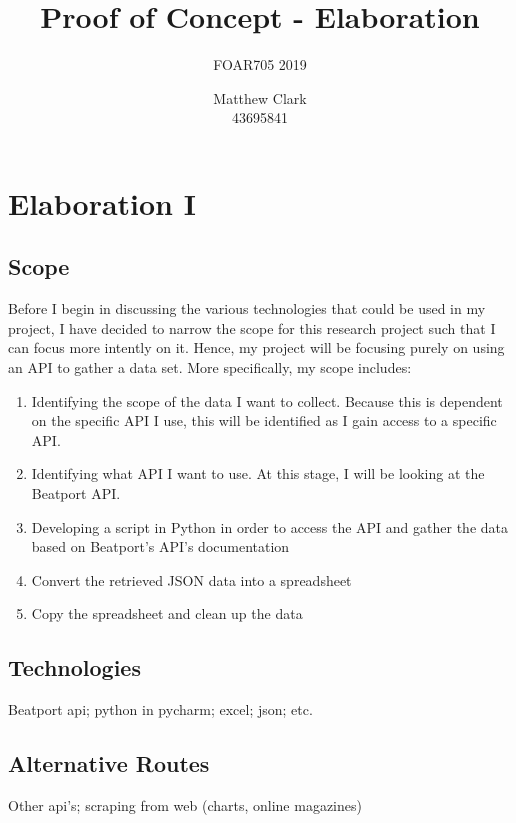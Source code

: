 \documentclass{article}
\title{Proof of Concept - Elaboration}
\subtitle{FOAR705 2019}
\author{Matthew Clark\\43695841}
\date{\vspace{-5ex}} %
\begin{document}
\doublespacing
\maketitle
\newpage
\tableofcontents
\newpage
\section{Elaboration I}
\subsection{Scope}
Before I begin in discussing the various technologies that could be used in my project, I have decided to narrow the scope for this research project such that I can focus more intently on it. Hence, my project will be focusing purely on using an API to gather a data set. More specifically, my scope includes:
\begin{enumerate}
    \item Identifying the scope of the data I want to collect. Because this is dependent on the specific API I use, this will be identified as I gain access to a specific API.
    \item Identifying what API I want to use. At this stage, I will be looking at the Beatport API.
    \item Developing a script in Python in order to access the API and gather the data based on Beatport's API's documentation
    \item Convert the retrieved JSON data into a spreadsheet
    \item Copy the spreadsheet and clean up the data
\end{enumerate}
\subsection{Technologies}
Beatport api; python in pycharm; excel; json; etc.
\subsection{Alternative Routes}
Other api's; scraping from web (charts, online magazines)
\end{document}
